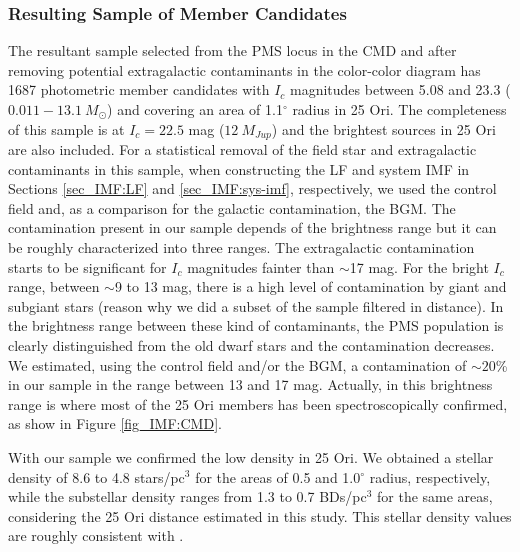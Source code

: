 \documentclass[12pt]{article}
\begin{document}
\subsubsection{Resulting Sample of Member Candidates}
\label{sec_IMF:sample}
The resultant sample selected from the PMS locus in the CMD and after removing potential extragalactic contaminants in the color-color diagram has 1687 photometric member candidates with $I_c$ magnitudes between 5.08 and 23.3 ($0.011-13.1\ M_\odot$) and covering an area of 1.1$^\circ$ radius in 25 Ori. The completeness of this sample is at $I_c=22.5$ mag ($12\ M_{Jup}$) and the brightest sources in 25 Ori are also included. For a statistical removal of the field star and extragalactic contaminants in this sample, when constructing the LF and system IMF in Sections \ref{sec_IMF:LF} and \ref{sec_IMF:sys-imf}, respectively, we used the control field and, as a comparison for the galactic contamination, the BGM. The contamination present in our sample depends of the brightness range but it can be roughly characterized into three ranges. The extragalactic contamination starts to be significant for $I_c$ magnitudes fainter than $\sim$17 mag. For the bright $I_c$ range, between $\sim$9 to 13 mag, there is a high level of contamination by giant and subgiant stars (reason why we did a subset of the sample filtered in distance). In the brightness range between these kind of contaminants, the PMS population is clearly distinguished from the old dwarf stars and the contamination decreases. We estimated, using the control field and/or the BGM, a contamination of $\sim20$\% in our sample in the range between 13 and 17 mag. Actually, in this brightness range is where most of the 25 Ori members has been spectroscopically confirmed, as show in Figure \ref{fig_IMF:CMD}.

With our sample we confirmed the low density in 25 Ori. We obtained a stellar density of 8.6 to 4.8 stars/pc$^3$ for the areas of 0.5 and 1.0$^\circ$ radius, respectively, while the substellar density ranges from 1.3 to 0.7 BDs/pc$^3$ for the same areas, considering the 25 Ori distance estimated in this study. This stellar density values are roughly consistent with \citet{Briceno2007,Downes2014,Briceno2018}.
\end{document}
